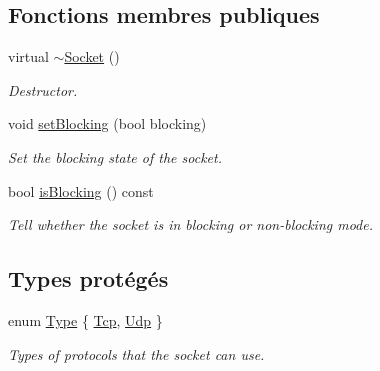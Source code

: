 \subsection*{Fonctions membres publiques}
\begin{DoxyCompactItemize}
\item 
\mbox{\label{classsf_1_1Socket_a79a4b5918f0b34a2f8db449089694788}} 
virtual \hyperlink{classsf_1_1Socket_a79a4b5918f0b34a2f8db449089694788}{$\sim$\+Socket} ()
\begin{DoxyCompactList}\small\item\em Destructor. \end{DoxyCompactList}\item 
void \hyperlink{classsf_1_1Socket_a165fc1423e281ea2714c70303d3a9782}{set\+Blocking} (bool blocking)
\begin{DoxyCompactList}\small\item\em Set the blocking state of the socket. \end{DoxyCompactList}\item 
bool \hyperlink{classsf_1_1Socket_ab1ceca9ac114b8baeeda3b34a0aca468}{is\+Blocking} () const
\begin{DoxyCompactList}\small\item\em Tell whether the socket is in blocking or non-\/blocking mode. \end{DoxyCompactList}\end{DoxyCompactItemize}
\subsection*{Types protégés}
\begin{DoxyCompactItemize}
\item 
enum \hyperlink{classsf_1_1Socket_a5d3ff44e56e68f02816bb0fabc34adf8}{Type} \{ \hyperlink{classsf_1_1Socket_a5d3ff44e56e68f02816bb0fabc34adf8acc02e97e90234b957eaad4dff7f22214}{Tcp}, 
\hyperlink{classsf_1_1Socket_a5d3ff44e56e68f02816bb0fabc34adf8a6ebf3094830db4820191a327f3cc6ce2}{Udp}
 \}\begin{DoxyCompactList}\small\item\em Types of protocols that the socket can use. \end{DoxyCompactList}
\end{DoxyCompactItemize}
